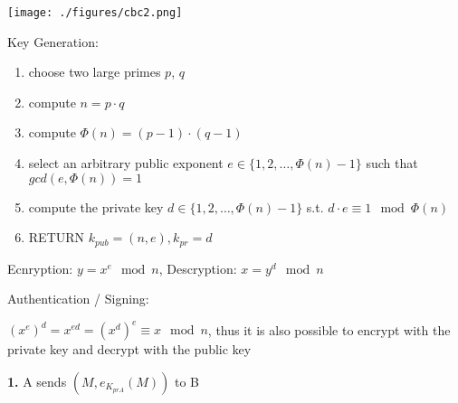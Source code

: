 \documentclass[landscape, a4paper]{article}
\begin{document}
\begin{minipage}[t]{0.2\linewidth}
\begin{betterlist}
\begin{betterlist}
			\texttt{[image: ./figures/cbc2.png]}
		\end{betterlist}
	\end{betterlist}
	\begin{betterlist}
		\item \alert{Key Generation:}
		\begin{enumerate}
			\item choose two large primes $p$, $q$
			\item compute $n = p \cdot q$
			\item compute $\Phi(n) = (p - 1) \cdot (q - 1)$
			\item select an arbitrary public exponent $e \in \{1, 2, \ldots, \Phi(n) - 1\}$ such that $gcd(e, \Phi(n) ) = 1$
			\item compute the private key $d \in \{1, 2, \ldots , \Phi(n) - 1\}$ s.t. $d \cdot e \equiv 1 \mod \Phi(n)$
			\item RETURN $k_{pub} = (n, e), k_{pr} = d$
		\end{enumerate}
		\item \alert{Ecnryption:} $y = x^e \mod n$, \alert{Descryption:} $x = y^d \mod n$
		\item \alert{Authentication / Signing:}
		\begin{betterlist}
			\item $(x^e)^d = x^{ed} = (x^d)^e \equiv x \mod n$, thus it is also possible to encrypt with the private key and decrypt with the public key
			\item[\color{PrimaryColor}\textbf{1.} ] A sends $(M, e_{K_{prA}}(M))$ to B

\end{betterlist}
\end{betterlist}
\end{minipage}
\end{document}

